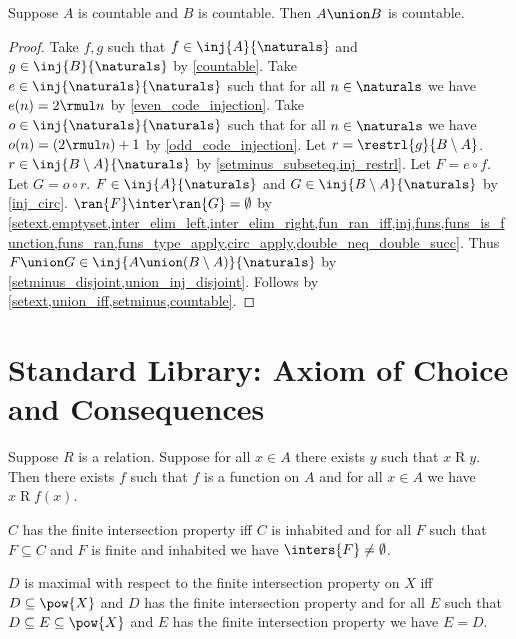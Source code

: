 \begin{lemma}\label{union_of_countable_is_countable}
    Suppose $A$ is countable and $B$ is countable.
    Then $A\union B$ is countable.
\end{lemma}
\begin{proof}
    Take $f,g$ such that $f\in\inj{A}{\naturals}$ and $g\in\inj{B}{\naturals}$ by \cref{countable}.
    Take $e\in\inj{\naturals}{\naturals}$ such that
    for all $n\in\naturals$ we have $e(n)=2\rmul n$ by \cref{even_code_injection}.
    Take $o\in\inj{\naturals}{\naturals}$ such that
    for all $n\in\naturals$ we have $o(n)=(2\rmul n)+1$ by \cref{odd_code_injection}.
    Let $r=\restrl{g}{B\setminus A}$.
    $r\in\inj{B\setminus A}{\naturals}$ by \cref{setminus_subseteq,inj_restrl}.
    Let $F=e\circ f$.
    Let $G=o\circ r$.
    $F\in\inj{A}{\naturals}$ and $G\in\inj{B\setminus A}{\naturals}$ by \cref{inj_circ}.
    $\ran{F}\inter\ran{G}=\emptyset$ by \cref{setext,emptyset,inter_elim_left,inter_elim_right,fun_ran_iff,inj,funs,funs_is_function,funs_ran,funs_type_apply,circ_apply,double_neq_double_succ}.
    Thus $F\union G\in\inj{A\union(B\setminus A)}{\naturals}$ by \cref{setminus_disjoint,union_inj_disjoint}.
    Follows by \cref{setext,union_iff,setminus,countable}.
\end{proof}

\section{Standard Library: Axiom of Choice and Consequences}

\begin{axiom}\label{axiom_of_choice}
    Suppose $R$ is a relation.
    Suppose for all $x\in A$ there exists $y$ such that $x\mathrel{R} y$.
    Then there exists $f$ such that $f$ is a function on $A$ and for all $x\in A$ we have $x\mathrel{R} f(x)$.
\end{axiom}

\begin{definition}\label{finite_intersection_property}
    $C$ has the finite intersection property iff
        $C$ is inhabited and
        for all $F$ such that $F\subseteq C$ and $F$ is finite and inhabited
        we have $\inters{F}\neq\emptyset$.
\end{definition}

\begin{definition}\label{maximal_finite_intersection_property_on}
    $D$ is maximal with respect to the finite intersection property on $X$ iff
        $D\subseteq\pow{X}$ and
        $D$ has the finite intersection property and
        for all $E$ such that $D\subseteq E\subseteq\pow{X}$ and $E$ has the finite intersection property
            we have $E = D$.
\end{definition}

